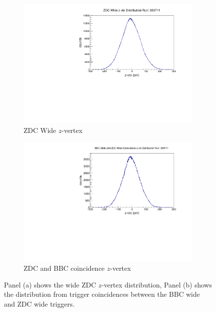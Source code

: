 \begin{figure}[hb]
  \centering
  \begin{subfigure}[b]{0.7\linewidth}
    \includegraphics[width=\textwidth]{./figures/zdc_wide_z_359711.pdf}
    \caption{ZDC Wide $z$-vertex}
    \label{fig:zdc_novtxcut}
  \end{subfigure}
  \begin{subfigure}[b]{0.7\linewidth}
    \includegraphics[width=\textwidth]{./figures/zdc_coincidence.pdf}
    \caption{ZDC and BBC coincidence $z$-vertex}
    \label{fig:zdc_and_bbc}
  \end{subfigure}
  \caption{
    Panel (a) shows the wide ZDC $z$-vertex distribution, Panel (b) shows the
    distribution from trigger coincidences between the BBC wide and ZDC wide
    triggers.
  }
  \label{fig:z_dep_generators}
\end{figure}


